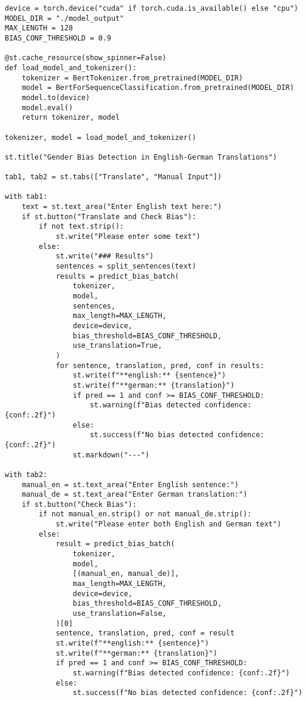 \begin{appendices}
\begin{lstlisting}
device = torch.device("cuda" if torch.cuda.is_available() else "cpu")
MODEL_DIR = "./model_output"
MAX_LENGTH = 128
BIAS_CONF_THRESHOLD = 0.9

@st.cache_resource(show_spinner=False)
def load_model_and_tokenizer():
    tokenizer = BertTokenizer.from_pretrained(MODEL_DIR)
    model = BertForSequenceClassification.from_pretrained(MODEL_DIR)
    model.to(device)
    model.eval()
    return tokenizer, model

tokenizer, model = load_model_and_tokenizer()

st.title("Gender Bias Detection in English-German Translations")

tab1, tab2 = st.tabs(["Translate", "Manual Input"])

with tab1:
    text = st.text_area("Enter English text here:")
    if st.button("Translate and Check Bias"):
        if not text.strip():
            st.write("Please enter some text")
        else:
            st.write("### Results")
            sentences = split_sentences(text)
            results = predict_bias_batch(
                tokenizer,
                model,
                sentences,
                max_length=MAX_LENGTH,
                device=device,
                bias_threshold=BIAS_CONF_THRESHOLD,
                use_translation=True,
            )
            for sentence, translation, pred, conf in results:
                st.write(f"**english:** {sentence}")
                st.write(f"**german:** {translation}")
                if pred == 1 and conf >= BIAS_CONF_THRESHOLD:
                    st.warning(f"Bias detected confidence: {conf:.2f}")
                else:
                    st.success(f"No bias detected confidence: {conf:.2f}")
                st.markdown("---")

with tab2:
    manual_en = st.text_area("Enter English sentence:")
    manual_de = st.text_area("Enter German translation:")
    if st.button("Check Bias"):
        if not manual_en.strip() or not manual_de.strip():
            st.write("Please enter both English and German text")
        else:
            result = predict_bias_batch(
                tokenizer,
                model,
                [(manual_en, manual_de)],
                max_length=MAX_LENGTH,
                device=device,
                bias_threshold=BIAS_CONF_THRESHOLD,
                use_translation=False,
            )[0]
            sentence, translation, pred, conf = result
            st.write(f"**english:** {sentence}")
            st.write(f"**german:** {translation}")
            if pred == 1 and conf >= BIAS_CONF_THRESHOLD:
                st.warning(f"Bias detected confidence: {conf:.2f}")
            else:
                st.success(f"No bias detected confidence: {conf:.2f}")
\end{lstlisting}


\end{appendices}
